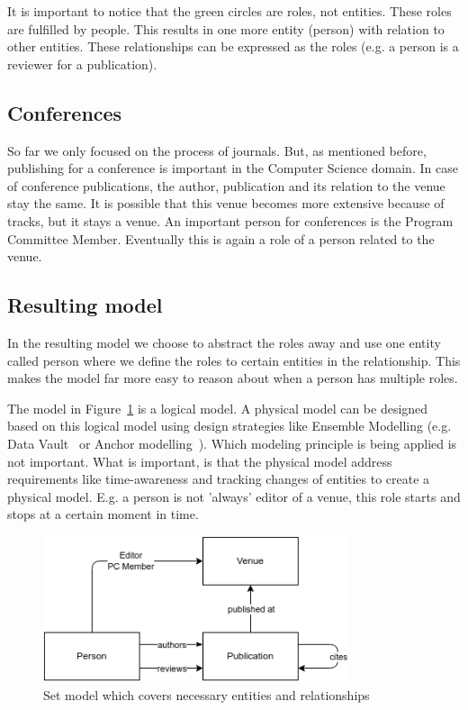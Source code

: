 \documentclass{ou-report}
\begin{document}
It is important to notice that the green circles are roles, not entities. These 
roles are fulfilled by people. This results in one more entity (person) with 
relation to other entities. These relationships can be expressed as the roles 
(e.g. a person is a reviewer for a publication).

\subsection{Conferences}
So far we only focused on the process of journals. But, as mentioned before, 
publishing for a conference is important in the Computer Science domain.
In case of conference publications, the author, publication and its relation to 
the venue stay the same. It is possible that this venue becomes more extensive 
because of tracks, but it stays a venue.
An important person for conferences is the Program Committee Member. Eventually
this is again a role of a person related to the venue.

\subsection{Resulting model}
\label{sec:resulting_model}
In the resulting model we choose to abstract the roles away and use one entity 
called person where we define the roles to certain entities in the relationship.
This makes the model far more easy to reason about when a person has multiple 
roles.

The model in Figure~\ref{fig:resulting_model} is a logical model. A physical
model can be designed based on this logical model using design
strategies like Ensemble Modelling (e.g. Data Vault~\cite{linstedt2015building}
or Anchor modelling~\cite{ronnback2010anchor}). Which
modeling principle is being applied is not important. What is important, is that
the physical model address requirements like time-awareness and tracking changes
of entities to create a physical model. E.g. a person is not 'always' 
editor of a venue, this role starts and stops at a certain moment in time.
\begin{figure}[t]
\centering
\includegraphics[width=9cm]{images/set_model.png}
\caption{Set model which covers necessary entities and relationships}
\label{fig:resulting_model}
\end{figure}
\end{document}
